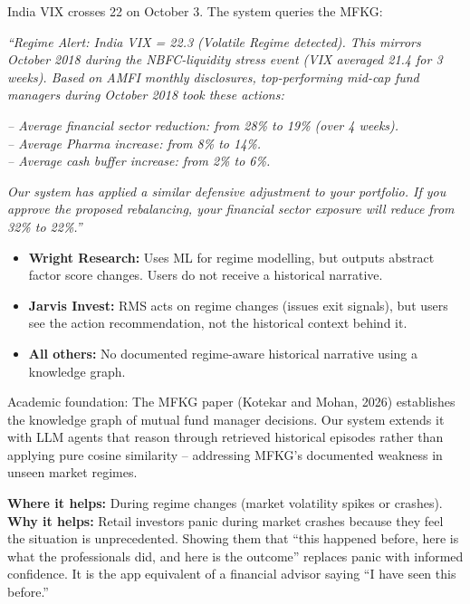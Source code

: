\documentclass[12pt, a4paper, openany, oneside]{report}
\begin{document}
\begin{examplebox}
India VIX crosses 22 on October 3. The system queries the MFKG:

\textit{``Regime Alert: India VIX = 22.3 (Volatile Regime detected). This mirrors October 2018 during the NBFC-liquidity stress event (VIX averaged 21.4 for 3 weeks). Based on AMFI monthly disclosures, top-performing mid-cap fund managers during October 2018 took these actions:}

\textit{-- Average financial sector reduction: from 28\% to 19\% (over 4 weeks).}\\
\textit{-- Average Pharma increase: from 8\% to 14\%.}\\
\textit{-- Average cash buffer increase: from 2\% to 6\%.}

\textit{Our system has applied a similar defensive adjustment to your portfolio. If you approve the proposed rebalancing, your financial sector exposure will reduce from 32\% to 22\%.''}
\end{examplebox}

\begin{gapbox}
\begin{itemize}[noitemsep]
  \item \textbf{Wright Research:} Uses ML for regime modelling, but outputs abstract factor score changes. Users do not receive a historical narrative.
  \item \textbf{Jarvis Invest:} RMS acts on regime changes (issues exit signals), but users see the action recommendation, not the historical context behind it.
  \item \textbf{All others:} No documented regime-aware historical narrative using a knowledge graph.
\end{itemize}
Academic foundation: The MFKG paper (Kotekar and Mohan, 2026) establishes the knowledge graph of mutual fund manager decisions. Our system extends it with LLM agents that reason through retrieved historical episodes rather than applying pure cosine similarity -- addressing MFKG's documented weakness in unseen market regimes.
\end{gapbox}

\begin{valuebox}
\textbf{Where it helps:} During regime changes (market volatility spikes or crashes). \textbf{Why it helps:} Retail investors panic during market crashes because they feel the situation is unprecedented. Showing them that ``this happened before, here is what the professionals did, and here is the outcome'' replaces panic with informed confidence. It is the app equivalent of a financial advisor saying ``I have seen this before.''
\end{valuebox}
\end{document}
